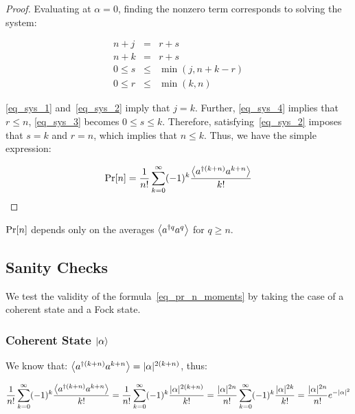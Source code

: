 \begin{proof}
Evaluating at $\alpha = 0$, finding the nonzero term corresponds to solving the system:

\begin{eqnarray} \label{eq_sys_1}
    n + j &=& r + s\\ \label{eq_sys_2}
    n + k &=& r + s\\ \label{eq_sys_3}
    0 \le s &\le& \min(j,n+k-r)\\ \label{eq_sys_4}
    0 \le r &\le& \min(k,n)
\end{eqnarray}

\autoref{eq_sys_1} and~\autoref{eq_sys_2} imply that $j = k$. Further, \autoref{eq_sys_4} implies that $r \le n$, \autoref{eq_sys_3} becomes $0 \le s \le k$. Therefore, satisfying~\autoref{eq_sys_2} imposes that $s = k$ and $r = n$, which implies that $n \le k$. Thus, we have the simple expression:

\begin{equation}
    \text{Pr}[n] = \frac{1}{n!} \sum_{k=0}^\infty (-1)^k \frac{\left\langle a^{\dagger (k+n)} a^{k+n} \right\rangle}{k!}
\end{equation}
\end{proof}
\begin{corollary}
    $\text{Pr}[n]$ depends only on the averages $\left\langle a^{\dagger q} a^{q} \right\rangle$ for $q \ge n$.
\end{corollary}

\subsection{Sanity Checks}

We test the validity of the formula~\autoref{eq_pr_n_moments} by taking the case of a coherent state and a Fock state.

\subsubsection{Coherent State $\ket{\alpha}$}

We know that: $\left\langle a^{\dagger (k+n)} a^{k+n} \right\rangle = |\alpha|^{2 (k+n)}$, thus:

\begin{equation}
    \frac{1}{n!} \sum_{k=0}^\infty (-1)^k \frac{\left\langle a^{\dagger (k+n)} a^{k+n} \right\rangle}{k!} = \frac{1}{n!} \sum_{k=0}^\infty (-1)^k \frac{|\alpha|^{2 (k+n)}}{k!} = \frac{|\alpha|^{2 n}}{n!} \sum_{k=0}^\infty (-1)^k \frac{|\alpha|^{2 k}}{k!} = \frac{|\alpha|^{2 n}}{n!} e^{-|\alpha|^2}
\end{equation}

